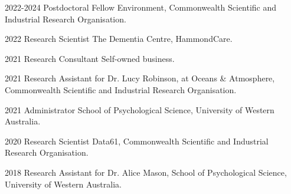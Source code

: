 

\begin{cvskills}

  \cvskill
    {2022-2024} %
    {Postdoctoral Fellow} %
    {Environment, Commonwealth Scientific and Industrial Research Organisation.} %

  \cvskill
    {2022} %
    {Research Scientist} %
    {The Dementia Centre, HammondCare.} %

  \cvskill
    {2021} %
    {Research Consultant} %
    {Self-owned business.} %

  \cvskill
    {2021} %
    {Research Assistant} %
    {for Dr. Lucy Robinson, at Oceans \& Atmosphere, Commonwealth Scientific and Industrial Research Organisation.} %

  \cvskill
    {2021} %
    {Administrator} %
    {School of Psychological Science, University of Western Australia.} %


  \cvskill
    {2020} %
    {Research Scientist} %
    {Data61, Commonwealth Scientific and Industrial Research Organisation.} %

  \cvskill
    {2018} %
    {Research Assistant} %
    {for Dr. Alice Mason, School of Psychological Science, University of Western Australia.} %

\end{cvskills}

